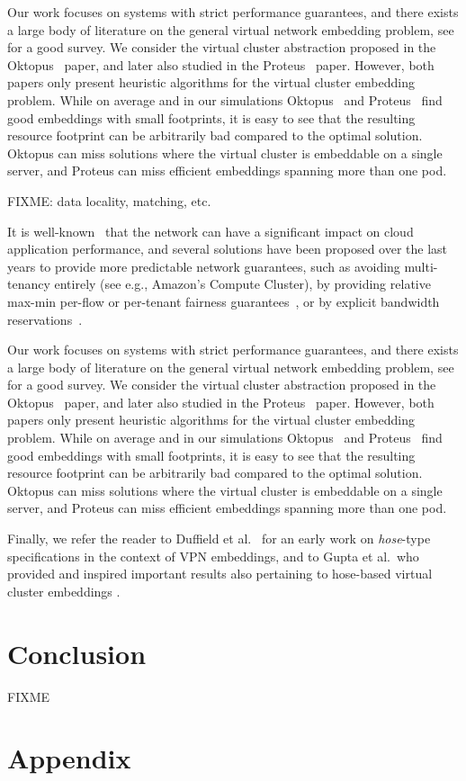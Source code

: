 \documentclass[9pt,twocolumn]{scrartcl}
\begin{document}
Our work focuses on systems with strict performance guarantees,
and there exists a large body of literature
on the general virtual network embedding problem, see~\cite{alloc-survey} for a good survey.
We consider the virtual cluster abstraction proposed
in the Oktopus~\cite{oktopus} paper, and later also studied in
the Proteus~\cite{proteus} paper. However, both papers only present
heuristic algorithms for the virtual cluster embedding problem.
While on average and in our simulations Oktopus~\cite{oktopus} and
Proteus~\cite{proteus} find good embeddings with small footprints,
it is easy to see that the resulting resource footprint
can be arbitrarily bad compared to the optimal solution.
Oktopus can miss solutions where the virtual cluster
is embeddable on a single server, and Proteus can miss efficient embeddings
spanning more than one pod.

FIXME: data locality, matching, etc.

It is well-known~\cite{talk-about} that the network
can have a significant impact on cloud application
performance, and several solutions have been proposed
over the last years to provide more predictable
network guarantees, such as avoiding multi-tenancy
entirely (see e.g., Amazon's Compute Cluster), by providing relative max-min
per-flow or per-tenant fairness
guarantees~\cite{seawall,netshare,faircloud,elasticswitch}, or by
explicit bandwidth
reservations~\cite{gatekeeper,secondnet,oktopus, proteus, drl}.

Our work focuses on systems with strict performance guarantees,
and there exists a large body of literature
on the general virtual network embedding problem, see~\cite{alloc-survey} for a good survey.
We consider the virtual cluster abstraction proposed
in the Oktopus~\cite{oktopus} paper, and later also studied in
the Proteus~\cite{proteus} paper. However, both papers only present
heuristic algorithms for the virtual cluster embedding problem.
While on average and in our simulations Oktopus~\cite{oktopus} and
Proteus~\cite{proteus} find good embeddings with small footprints,
it is easy to see that the resulting resource footprint
can be arbitrarily bad compared to the optimal solution.
Oktopus can miss solutions where the virtual cluster
is embeddable on a single server, and Proteus can miss efficient embeddings
spanning more than one pod.

Finally, we refer the reader to Duffield et al.~\cite{hose-vpn} for an early work
 on \emph{hose}-type specifications in the context of VPN embeddings, and to Gupta et al.~who
 provided and inspired important results also pertaining to hose-based
 virtual cluster embeddings \cite{gupta2001provisioning,Goyal2008}.

\section{Conclusion}\label{sec:conclusion}

FIXME

\section{Appendix}



\end{document}
